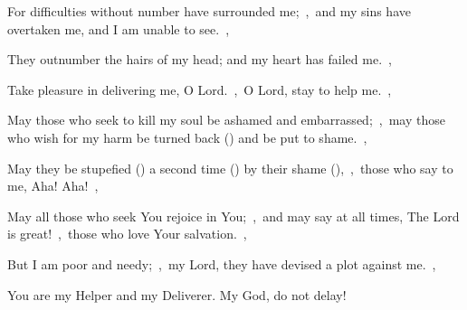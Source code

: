 \documentclass[12pt,twoside,a5paper]{article}
\begin{document}
\begin{normalparskip}
  For difficulties without number have surrounded me;~\sep\ and my sins have overtaken me, and I am unable to see.~\sep

  They outnumber the hairs of my head; and my heart has failed me.~\sep

  Take pleasure in delivering me, O Lord.~\sep\ O Lord, stay to help me.~\sep

  May those who seek to kill my soul be ashamed and embarrassed;~\sep\ may those who wish for my harm be turned back () and be put to shame.~\sep

  May they be stupefied () a second time () by their shame (),~\sep\ those who say to me, Aha! Aha!~\sep

  May all those who seek You rejoice in You;~\sep\ and may say at all times, The Lord is great!~\sep\ those who love Your salvation.~\sep

  But I am poor and needy;~\sep\ my Lord, they have devised a plot against me.~\sep

  You are my Helper and my Deliverer. My God, do not delay!
\end{normalparskip}





\end{document}
